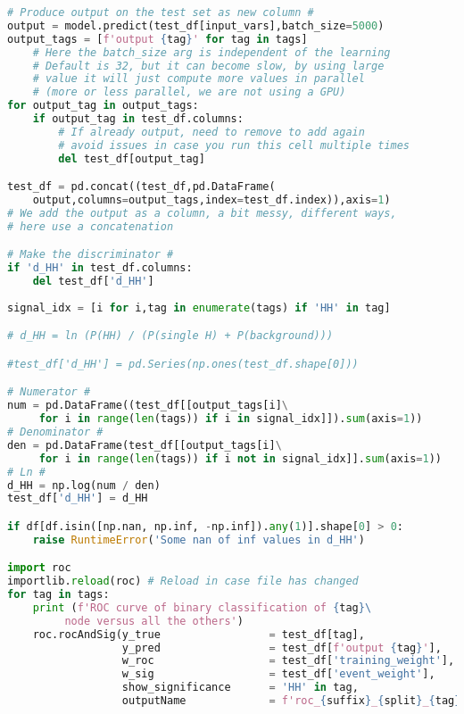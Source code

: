 \begin{lstlisting}[language=Python, caption=Python module of the analysis used in Bamboo framework, label={dnncode}]
# Produce output on the test set as new column #
output = model.predict(test_df[input_vars],batch_size=5000)
output_tags = [f'output {tag}' for tag in tags]
    # Here the batch_size arg is independent of the learning
    # Default is 32, but it can become slow, by using large 
    # value it will just compute more values in parallel
    # (more or less parallel, we are not using a GPU)
for output_tag in output_tags:
    if output_tag in test_df.columns:
        # If already output, need to remove to add again
        # avoid issues in case you run this cell multiple times
        del test_df[output_tag]

test_df = pd.concat((test_df,pd.DataFrame(
    output,columns=output_tags,index=test_df.index)),axis=1)
# We add the output as a column, a bit messy, different ways, 
# here use a concatenation

# Make the discriminator #
if 'd_HH' in test_df.columns:
    del test_df['d_HH']
    
signal_idx = [i for i,tag in enumerate(tags) if 'HH' in tag]

# d_HH = ln (P(HH) / (P(single H) + P(background)))

#test_df['d_HH'] = pd.Series(np.ones(test_df.shape[0]))

# Numerator #
num = pd.DataFrame((test_df[[output_tags[i]\
     for i in range(len(tags)) if i in signal_idx]]).sum(axis=1))
# Denominator #
den = pd.DataFrame(test_df[[output_tags[i]\
     for i in range(len(tags)) if i not in signal_idx]].sum(axis=1))
# Ln #
d_HH = np.log(num / den)
test_df['d_HH'] = d_HH

if df[df.isin([np.nan, np.inf, -np.inf]).any(1)].shape[0] > 0:
    raise RuntimeError('Some nan of inf values in d_HH')

import roc
importlib.reload(roc) # Reload in case file has changed
for tag in tags:
    print (f'ROC curve of binary classification of {tag}\
         node versus all the others')
    roc.rocAndSig(y_true                 = test_df[tag],
                  y_pred                 = test_df[f'output {tag}'],
                  w_roc                  = test_df['training_weight'],
                  w_sig                  = test_df['event_weight'],
                  show_significance      = 'HH' in tag,
                  outputName             = f'roc_{suffix}_{split}_{tag}.pdf')


\end{lstlisting}
